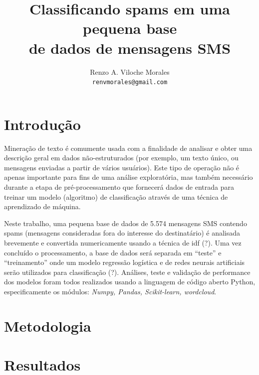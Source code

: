 \documentclass[a4paper,11pt]{article}
\title{ Classificando spams em uma pequena base \\ de dados de mensagens SMS}
\author{Renzo A. Viloche Morales \\ \texttt{renvmorales@gmail.com}}
\begin{document}
\maketitle

\section{Introdução}

Mineração de texto é comumente usada com a finalidade de analisar e obter uma descrição geral em 
dados não-estruturados (por exemplo, um texto único, ou mensagens enviadas a partir de vários 
usuários). Este tipo de operação não é apenas importante para fins de uma análise exploratória, 
mas também necessário durante a etapa de pré-processamento que fornecerá dados de entrada para 
treinar um modelo (algoritmo) de classificação através de uma técnica de aprendizado de máquina. 

Neste trabalho, uma pequena base de dados de 5.574 mensagens SMS contendo spams (mensagens 
consideradas fora do interesse do destinatário) é analisada brevemente e convertida numericamente 
usando a técnica de idf (?). Uma vez concluído o processamento, a base de dados será separada 
em ``teste'' e ``treinamento'' onde um modelo regressão logística e de redes neurais artificiais 
serão utilizados para classificação (?). Análises, teste e validação de performance dos modelos
foram todos realizados usando a linguagem de código aberto Python, especificamente os módulos: 
\textit{Numpy, Pandas, Scikit-learn, wordcloud}.





\section{Metodologia}



\section{Resultados}
\end{document}
